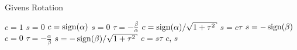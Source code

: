 \begin{algorithm}
\caption{Givens Rotation}
\label{alg:givens}
\begin{algorithmic}[1]
    \If{$\abs{\alpha}\ge\abs{\beta}$}
            \State $c=1$
            \State $s = 0$
            \State $c = \operatorname{sign}(\alpha)$
            \State $s = 0$
        \Else
            \State $\tau = -\frac{\beta}{\alpha}$
            \State $c = \sign(\alpha)/\sqrt{1 + \tau^{2}}$
            \State $s = c\tau$
        \EndIf
    \Else
            \State $s = -\operatorname{sign}(\beta)$
            \State $c = 0$
        \Else
            \State $\tau = -\frac{\alpha}{\beta}$
            \State $s = -\sign(\beta)/\sqrt{1 + \tau^{2}}$
            \State $c = s\tau$
        \EndIf
    \EndIf
\State \Return $c$, $s$
\EndFunction
\end{algorithmic}
\end{algorithm}
